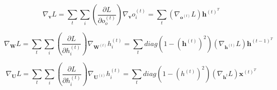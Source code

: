 	\begin{equation}
	\nabla_{\textbf{v}}L = \sum_{t} \sum_{i} \left( \frac{\partial L}{\partial o_o^{(t)}}\right) \nabla_{\textbf{v}}{o_i^{(t)}} = \sum_{t} (\nabla_{\textbf{o}^{(t)}}L) \textbf{h}^{(t)^T}
	\end{equation}
	
	\begin{equation}
		\nabla_{\textbf{W}}L = \sum_{t} \sum_{i} \left(\frac{\partial L}{ \partial h_i^{(t)}}\right) \nabla_{\textbf{W}^{(t)}} h_i^{(t)} = \sum_{t}diag\left( 1 - \left(\textbf{h}^{(t)}\right)^2\right) (\nabla_{\textbf{h}^{(t)}}L)\textbf{h}^{(t-1)^T}
	\end{equation}
	
	\begin{equation}
		\nabla_{\textbf{U}}L = \sum_{t} \sum_{i} \left(\frac{\partial L}{\partial h_i^{(t)}} \right) \nabla_{\textbf{U}^{(t)}}h_i^{(t)} = \sum_t diag \left(1 - \left(h^(t)\right)^2\right) (\nabla_{\textbf{h}^{t}}L)\textbf{x}^{(t)^T}
	\end{equation}